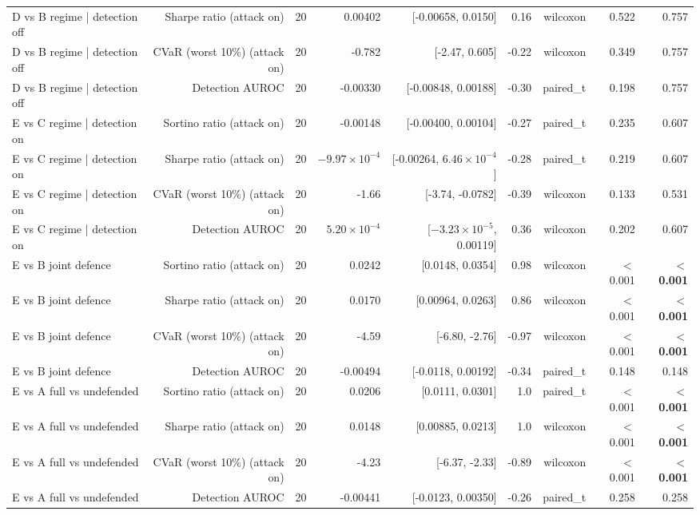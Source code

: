 \begin{table}[htbp]
\begin{tabular}{lrrrrrrrr}
    D vs B   regime | detection off & Sharpe ratio (attack on) & 20 & 0.00402 & [-0.00658, 0.0150] & 0.16 & wilcoxon & 0.522 & 0.757 \\
    D vs B   regime | detection off & CVaR (worst 10\%) (attack on) & 20 & -0.782 & [-2.47, 0.605] & -0.22 & wilcoxon & 0.349 & 0.757 \\
    D vs B   regime | detection off & Detection AUROC & 20 & -0.00330 & [-0.00848, 0.00188] & -0.30 & paired\_t & 0.198 & 0.757 \\
    E vs C   regime | detection on & Sortino ratio (attack on) & 20 & -0.00148 & [-0.00400, 0.00104] & -0.27 & paired\_t & 0.235 & 0.607 \\
    E vs C   regime | detection on & Sharpe ratio (attack on) & 20 & $-9.97\times10^{-4}$ & [-0.00264, $6.46\times10^{-4}$] & -0.28 & paired\_t & 0.219 & 0.607 \\
    E vs C   regime | detection on & CVaR (worst 10\%) (attack on) & 20 & -1.66 & [-3.74, -0.0782] & -0.39 & wilcoxon & 0.133 & 0.531 \\
    E vs C   regime | detection on & Detection AUROC & 20 & $5.20\times10^{-4}$ & [$-3.23\times10^{-5}$, 0.00119] & 0.36 & wilcoxon & 0.202 & 0.607 \\
    E vs B   joint defence & Sortino ratio (attack on) & 20 & 0.0242 & [0.0148, 0.0354] & 0.98 & wilcoxon & $<$0.001 & \textbf{$<$0.001} \\
    E vs B   joint defence & Sharpe ratio (attack on) & 20 & 0.0170 & [0.00964, 0.0263] & 0.86 & wilcoxon & $<$0.001 & \textbf{$<$0.001} \\
    E vs B   joint defence & CVaR (worst 10\%) (attack on) & 20 & -4.59 & [-6.80, -2.76] & -0.97 & wilcoxon & $<$0.001 & \textbf{$<$0.001} \\
    E vs B   joint defence & Detection AUROC & 20 & -0.00494 & [-0.0118, 0.00192] & -0.34 & paired\_t & 0.148 & 0.148 \\
    E vs A   full vs undefended & Sortino ratio (attack on) & 20 & 0.0206 & [0.0111, 0.0301] & 1.0 & paired\_t & $<$0.001 & \textbf{$<$0.001} \\
    E vs A   full vs undefended & Sharpe ratio (attack on) & 20 & 0.0148 & [0.00885, 0.0213] & 1.0 & wilcoxon & $<$0.001 & \textbf{$<$0.001} \\
    E vs A   full vs undefended & CVaR (worst 10\%) (attack on) & 20 & -4.23 & [-6.37, -2.33] & -0.89 & wilcoxon & $<$0.001 & \textbf{$<$0.001} \\
    E vs A   full vs undefended & Detection AUROC & 20 & -0.00441 & [-0.0123, 0.00350] & -0.26 & paired\_t & 0.258 & 0.258 \\

\end{tabular}
\end{table}
